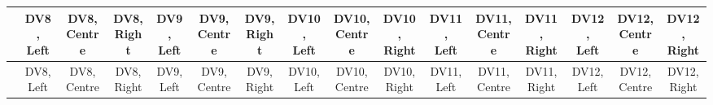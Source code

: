 
\begin{center}
\begin{small}
\begin{longtable}{l@{} c@{} c@{} c@{} c@{} c@{} c@{} c@{} c@{} c@{} c@{} c@{} c@{} c@{} c@{} c@{}}
\hline
 & \shortstack{\rule{0pt}{2.2ex}DV8,\\Left} & \shortstack{\rule{0pt}{2.2ex}DV8,\\Centre} & \shortstack{\rule{0pt}{2.2ex}DV8,\\Right} & \shortstack{\rule{0pt}{2.2ex}DV9,\\Left} & \shortstack{\rule{0pt}{2.2ex}DV9,\\Centre} & \shortstack{\rule{0pt}{2.2ex}DV9,\\Right} & \shortstack{\rule{0pt}{2.2ex}DV10,\\Left} & \shortstack{\rule{0pt}{2.2ex}DV10,\\Centre} & \shortstack{\rule{0pt}{2.2ex}DV10,\\Right} & \shortstack{\rule{0pt}{2.2ex}DV11,\\Left} & \shortstack{\rule{0pt}{2.2ex}DV11,\\Centre} & \shortstack{\rule{0pt}{2.2ex}DV11,\\Right} & \shortstack{\rule{0pt}{2.2ex}DV12,\\Left} & \shortstack{\rule{0pt}{2.2ex}DV12,\\Centre} & \shortstack{\rule{0pt}{2.2ex}DV12,\\Right} \\
\hline
\endfirsthead
\hline
 & \shortstack{\rule{0pt}{2.2ex}DV8,\\Left} & \shortstack{\rule{0pt}{2.2ex}DV8,\\Centre} & \shortstack{\rule{0pt}{2.2ex}DV8,\\Right} & \shortstack{\rule{0pt}{2.2ex}DV9,\\Left} & \shortstack{\rule{0pt}{2.2ex}DV9,\\Centre} & \shortstack{\rule{0pt}{2.2ex}DV9,\\Right} & \shortstack{\rule{0pt}{2.2ex}DV10,\\Left} & \shortstack{\rule{0pt}{2.2ex}DV10,\\Centre} & \shortstack{\rule{0pt}{2.2ex}DV10,\\Right} & \shortstack{\rule{0pt}{2.2ex}DV11,\\Left} & \shortstack{\rule{0pt}{2.2ex}DV11,\\Centre} & \shortstack{\rule{0pt}{2.2ex}DV11,\\Right} & \shortstack{\rule{0pt}{2.2ex}DV12,\\Left} & \shortstack{\rule{0pt}{2.2ex}DV12,\\Centre} & \shortstack{\rule{0pt}{2.2ex}DV12,\\Right} \\

\end{longtable}
\end{small}
\end{center}
